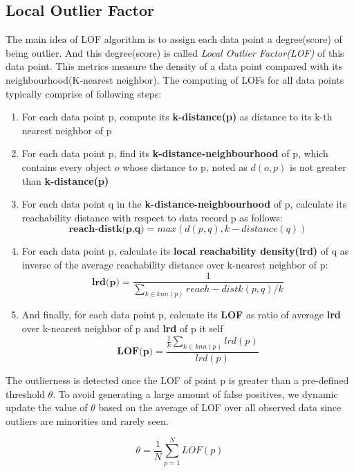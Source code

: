 \documentclass[11pt]{article}       %
\begin{document}
\subsection{Local Outlier Factor} \label{subsect1}

The main idea of LOF algorithm is to assign each data point a degree(score) of being outlier. And this degree(score) is called \textit{Local Outlier Factor(LOF)} of this data point. This metrics measure the density of a data point compared with its neighbourhood(K-nearest neighbor). The computing of LOFs for all data points typically comprise of following steps\cite{Breunig:2000:LID:342009.335388}:

\begin{enumerate}
	\item For each data point p, compute its \textbf{k-distance(p)} as distance to its k-th nearest neighbor of p
	\item For each data point p, find its \textbf{k-distance-neighbourhood} of p, which contains every object $o$ whose distance to p, noted as $d(o, p)$ is not greater than \textbf{k-distance(p)}
	\item For each data point q in the \textbf{k-distance-neighbourhood} of p, calculate its reachability distance with respect to data record p as follows:
		\[ \textbf{reach-distk(p,q)} = max(d(p,q), k-distance(q)) \]
	\item For each data point p, calculate its \textbf{local reachability density(lrd)} of q as inverse of the average reachability distance over k-nearest neighbor of p:
		\[ \textbf{lrd(p)} =  \frac{1}{\sum\limits_{k \in knn(p)} reach-distk(p,q) / k} \]
	\item And finally, for each data point p, calcuate its \textbf{LOF} as ratio of average \textbf{lrd} over k-nearest neighbor of p and \textbf{lrd} of p it self
		\[  \textbf{LOF(p)} = \frac{\frac{1}{k} \sum_{k \in knn(p)} lrd(p)}{lrd(p)} \]
\end{enumerate}

The outlierness is detected once the LOF of point p is greater than a pre-defined threshold $\theta$. To avoid generating a large amount of false positives, we dynamic update the value of $\theta$ based on the average of LOF over all observed data since outliers are minorities and rarely seen.

\[ \theta = \frac{1}{N} \sum_{p=1}^{N} LOF(p) \]
\end{document}
